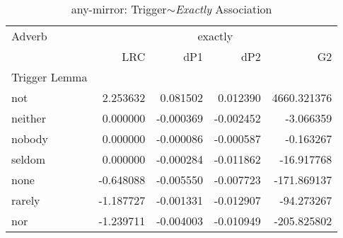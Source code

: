 
\begin{table}[ht]
\caption{any-mirror: Trigger$\sim$\textit{Exactly} Association}
\label{trigger-exactly-AM}
\begin{tabular}{lrrrr}
\toprule
Adverb & \multicolumn{4}{|c|}{exactly} \\
 & LRC & dP1 & dP2 & G2 \\
Trigger Lemma &  &  &  &  \\
\midrule
not & {\cellcolor[HTML]{67001F}} \color[HTML]{F1F1F1} 2.253632 & {\cellcolor[HTML]{67001F}} \color[HTML]{F1F1F1} 0.081502 & {\cellcolor[HTML]{67001F}} \color[HTML]{F1F1F1} 0.012390 & {\cellcolor[HTML]{67001F}} \color[HTML]{F1F1F1} 4660.321376 \\
neither & {\cellcolor[HTML]{FCD5BF}} \color[HTML]{000000} 0.000000 & {\cellcolor[HTML]{78B4D5}} \color[HTML]{000000} -0.000369 & {\cellcolor[HTML]{DBEAF2}} \color[HTML]{000000} -0.002452 & {\cellcolor[HTML]{A5CEE3}} \color[HTML]{000000} -3.066359 \\
nobody & {\cellcolor[HTML]{FCD5BF}} \color[HTML]{000000} 0.000000 & {\cellcolor[HTML]{7BB6D6}} \color[HTML]{000000} -0.000086 & {\cellcolor[HTML]{F6F7F7}} \color[HTML]{000000} -0.000587 & {\cellcolor[HTML]{A5CEE3}} \color[HTML]{000000} -0.163267 \\
seldom & {\cellcolor[HTML]{FCD5BF}} \color[HTML]{000000} 0.000000 & {\cellcolor[HTML]{78B4D5}} \color[HTML]{000000} -0.000284 & {\cellcolor[HTML]{175290}} \color[HTML]{F1F1F1} -0.011862 & {\cellcolor[HTML]{A2CDE3}} \color[HTML]{000000} -16.917768 \\
none & {\cellcolor[HTML]{F7F6F6}} \color[HTML]{000000} -0.648088 & {\cellcolor[HTML]{529DC8}} \color[HTML]{F1F1F1} -0.005550 & {\cellcolor[HTML]{569FC9}} \color[HTML]{F1F1F1} -0.007723 & {\cellcolor[HTML]{96C7DF}} \color[HTML]{000000} -171.869137 \\
rarely & {\cellcolor[HTML]{D4E6F1}} \color[HTML]{000000} -1.187727 & {\cellcolor[HTML]{71B0D3}} \color[HTML]{F1F1F1} -0.001331 & {\cellcolor[HTML]{0C3D73}} \color[HTML]{F1F1F1} -0.012907 & {\cellcolor[HTML]{9DCBE1}} \color[HTML]{000000} -94.273267 \\
nor & {\cellcolor[HTML]{D1E5F0}} \color[HTML]{000000} -1.239711 & {\cellcolor[HTML]{5FA5CD}} \color[HTML]{F1F1F1} -0.004003 & {\cellcolor[HTML]{2065AB}} \color[HTML]{F1F1F1} -0.010949 & {\cellcolor[HTML]{90C4DD}} \color[HTML]{000000} -205.825802 \\

\end{tabular}
\end{table}
